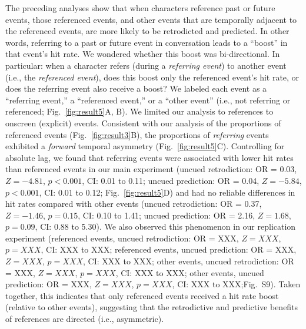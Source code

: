 \documentclass[10pt]{article}
\newcommand{\referringReferenced}{S9}
\begin{document}
The preceding analyses show that when characters reference past or future
events, those referenced events, and other events that are temporally adjacent
to the referenced events, are more likely to be retrodicted and predicted. In
other words, referring to a past or future event in conversation leads to a
``boost'' in that event's hit rate. We wondered whether this boost was
bi-directional. In particular: when a character refers (during a
\textit{referring event}) to another event (i.e., the \textit{referenced
event}), does this boost only the referenced event's hit rate, or does the
referring event also receive a boost? We labeled each event as a ``referring
event,'' a ``referenced event,'' or a ``other event'' (i.e., not referring or
referenced; Fig.~\ref{fig:result5}A, B). We limited our analysis to references
to onscreen (explicit) events. Consistent with our analysis of the proportions
of referenced events (Fig.~\ref{fig:result3}B), the proportions of
\textit{referring} events exhibited a \textit{forward} temporal asymmetry
(Fig.~\ref{fig:result5}C). Controlling for absolute lag, we found that
referring events were associated with lower hit rates than referenced events in
our main experiment (uncued retrodiction: OR = 0.03, $Z = -4.81$, $p < 0.001$,
CI: 0.01 to 0.11; uncued prediction: OR = 0.04, $Z = -5.84$, $p < 0.001$, CI:
0.01 to 0.12; Fig.~\ref{fig:result5}D) and had no reliable differences in hit
rates compared with other events (uncued retrodiction: OR = 0.37, $Z = -1.46$,
$p = 0.15$, CI: 0.10 to 1.41; uncued prediction: OR = 2.16, $Z = 1.68$, $p =
0.09$, CI: 0.88 to 5.30). We also observed this phenomenon in our replication
experiment (referenced events, uncued retrodiction: OR = XXX, $Z = XXX$, $p =
XXX$, CI: XXX to XXX; referenced events, uncued prediction: OR = XXX, $Z =
XXX$, $p = XXX$, CI: XXX to XXX; other events, uncued retrodiction: OR = XXX,
$Z = XXX$, $p = XXX$, CI: XXX to XXX; other events, uncued prediction: OR =
XXX, $Z = XXX$, $p = XXX$, CI: XXX to XXX;Fig.~\referringReferenced). Taken
together, this indicates that only referenced events received a hit rate boost
(relative to other events), suggesting that the retrodictive and predictive
benefits of references are directed (i.e., asymmetric).
\end{document}
